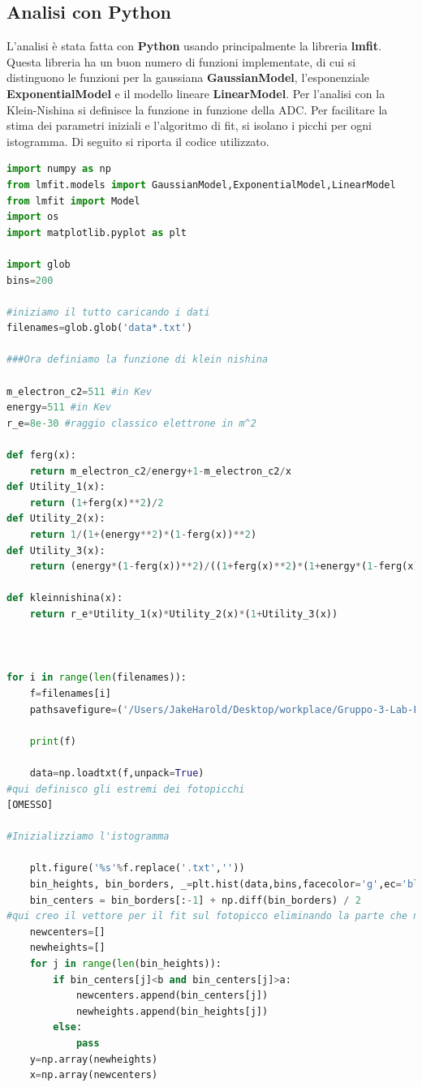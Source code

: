 \documentclass[a4paper]{article}
\begin{document}
\subsection{Analisi con Python}
L'analisi è stata fatta con \textbf{Python} usando principalmente la libreria \textbf{lmfit}. Questa libreria ha un buon numero di funzioni implementate, di cui si distinguono le funzioni per la gaussiana \textbf{GaussianModel}, l'esponenziale \textbf{ExponentialModel} e il modello lineare \textbf{LinearModel}. Per l'analisi con la Klein-Nishina si definisce la funzione in funzione della ADC. Per facilitare la stima dei parametri iniziali e l'algoritmo di fit, si isolano i picchi per ogni istogramma. Di seguito si riporta il codice utilizzato. 
\begin{lstlisting}[language=Python]
import numpy as np
from lmfit.models import GaussianModel,ExponentialModel,LinearModel
from lmfit import Model
import os
import matplotlib.pyplot as plt

import glob
bins=200

#iniziamo il tutto caricando i dati
filenames=glob.glob('data*.txt')

###Ora definiamo la funzione di klein nishina

m_electron_c2=511 #in Kev
energy=511 #in Kev
r_e=8e-30 #raggio classico elettrone in m^2

def ferg(x):
    return m_electron_c2/energy+1-m_electron_c2/x
def Utility_1(x):
    return (1+ferg(x)**2)/2
def Utility_2(x):
    return 1/(1+(energy**2)*(1-ferg(x))**2)
def Utility_3(x):
    return (energy*(1-ferg(x))**2)/((1+ferg(x)**2)*(1+energy*(1-ferg(x))))

def kleinnishina(x):
    return r_e*Utility_1(x)*Utility_2(x)*(1+Utility_3(x))



for i in range(len(filenames)):
    f=filenames[i]
    pathsavefigure=('/Users/JakeHarold/Desktop/workplace/Gruppo-3-Lab-Fisica-Medica/BGORESOLUTION/latex/histklein%s.png'%f.replace('.txt',''))

    print(f)

    data=np.loadtxt(f,unpack=True)
#qui definisco gli estremi dei fotopicchi
[OMESSO]

#Inizializziamo l'istogramma

    plt.figure('%s'%f.replace('.txt',''))
    bin_heights, bin_borders, _=plt.hist(data,bins,facecolor='g',ec='black',alpha=0.5,label='histogram data',density=True)
    bin_centers = bin_borders[:-1] + np.diff(bin_borders) / 2
#qui creo il vettore per il fit sul fotopicco eliminando la parte che non interessa
    newcenters=[]
    newheights=[]
    for j in range(len(bin_heights)):
        if bin_centers[j]<b and bin_centers[j]>a:
            newcenters.append(bin_centers[j])
            newheights.append(bin_heights[j])
        else:
            pass
    y=np.array(newheights)
    x=np.array(newcenters)


\end{lstlisting}
\end{document}
